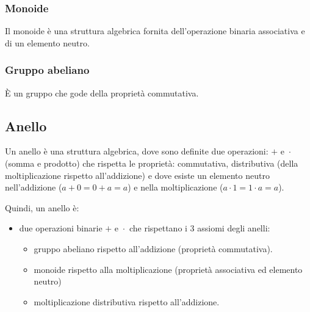 \subsubsection{Monoide}

\textsf{\small Il monoide è una struttura algebrica fornita dell'operazione binaria associativa e di un elemento neutro.}

\subsubsection{Gruppo abeliano}

\textsf{\small  È un gruppo che gode della proprietà commutativa.}

\subsection{Anello}


\textsf{\small Un anello è una struttura algebrica, dove sono definite due operazioni: $+ \text{ e } \cdot$ (somma e prodotto) che rispetta le proprietà: commutativa, distributiva (della moltiplicazione rispetto all'addizione) e dove esiste un elemento neutro nell'addizione ($a + 0 = 0 + a = a$) e nella moltiplicazione ($a \cdot 1 = 1 \cdot a = a$).}

\textsf{\small Quindi, un anello è: }

\begin{itemize}
	\item \textsf{\small  due operazioni binarie $+ \text{ e } \cdot$ che rispettano i 3 assiomi degli anelli:}
	\begin{itemize}
		\item \textsf{\small gruppo abeliano rispetto all'addizione (proprietà commutativa).}
		\item \textsf{\small monoide rispetto alla moltiplicazione (proprietà associativa ed elemento neutro)}
		\item \textsf{\small moltiplicazione distributiva rispetto all'addizione.}
	\end{itemize}
\end{itemize}

